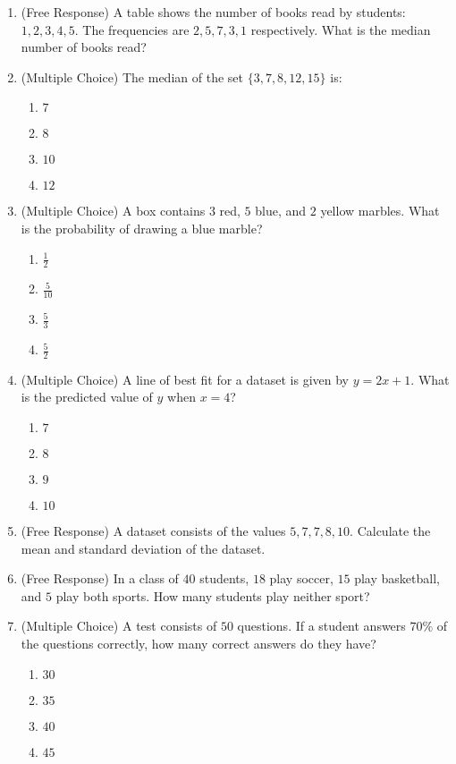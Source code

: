 \documentclass[12pt]{article}
\begin{document}
\begin{enumerate}[label=\textbf{Question \arabic*:}]
  \item (Free Response) A table shows the number of books read by students: \(1, 2, 3, 4, 5\). The frequencies are \(2, 5, 7, 3, 1\) respectively. What is the median number of books read?

  \item (Multiple Choice) The median of the set \(\{3, 7, 8, 12, 15\}\) is:
    \begin{enumerate}[label=(\Alph*)]
      \item \(7\)
      \item \(8\)
      \item \(10\)
      \item \(12\)
    \end{enumerate}
    
  \item (Multiple Choice) A box contains \(3\) red, \(5\) blue, and \(2\) yellow marbles. What is the probability of drawing a blue marble?
    \begin{enumerate}[label=(\Alph*)]
      \item \(\frac{1}{2}\)
      \item \(\frac{5}{10}\)
      \item \(\frac{5}{3}\)
      \item \(\frac{5}{2}\)
    \end{enumerate}
    
  \item (Multiple Choice) A line of best fit for a dataset is given by \(y = 2x + 1\). What is the predicted value of \(y\) when \(x = 4\)?
    \begin{enumerate}[label=(\Alph*)]
      \item \(7\)
      \item \(8\)
      \item \(9\)
      \item \(10\)
    \end{enumerate}
    
  \item (Free Response) A dataset consists of the values \(5, 7, 7, 8, 10\). Calculate the mean and standard deviation of the dataset.
    
  \item (Free Response) In a class of \(40\) students, \(18\) play soccer, \(15\) play basketball, and \(5\) play both sports. How many students play neither sport?

  \item (Multiple Choice) A test consists of \(50\) questions. If a student answers \(70\%\) of the questions correctly, how many correct answers do they have?
    \begin{enumerate}[label=(\Alph*)]
      \item \(30\)
      \item \(35\)
      \item \(40\)
      \item \(45\)
    \end{enumerate}
    

\end{enumerate}
\end{document}
